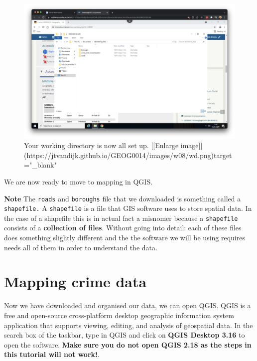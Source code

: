 \documentclass[
]{book}
\begin{document}
\begin{figure}

{\centering \includegraphics[width=850pt]{images/w08/wd} 

}

\caption{Your working directory is now all set up. [[Enlarge image]](https://jtvandijk.github.io/GEOG0014/images/w08/wd.png){target="_blank"}}\label{fig:wd}
\end{figure}

We are now ready to move to mapping in QGIS.

\textbf{Note}
The \texttt{roads} and \texttt{boroughs} file that we downloaded is something called a \texttt{shapefile.} A \texttt{shapefile} is a file that GIS software uses to store spatial data. In the case of a shapefile this is in actual fact a misnomer because a \texttt{shapefile} consists of a \textbf{collection of files}. Without going into detail: each of these files does something slightly different and the the software we will be using requires needs all of them in order to understand the data.

\hypertarget{mapping-crime-data}{%
\section*{Mapping crime data}\label{mapping-crime-data}}

Now we have downloaded and organised our data, we can open QGIS. QGIS is a free and open-source cross-platform desktop geographic information system application that supports viewing, editing, and analysis of geospatial data. In the search box of the taskbar, type in QGIS and click on \textbf{QGIS Desktop 3.16} to open the software. \textbf{Make sure you do not open QGIS 2.18 as the steps in this tutorial will not work!}.
\end{document}
